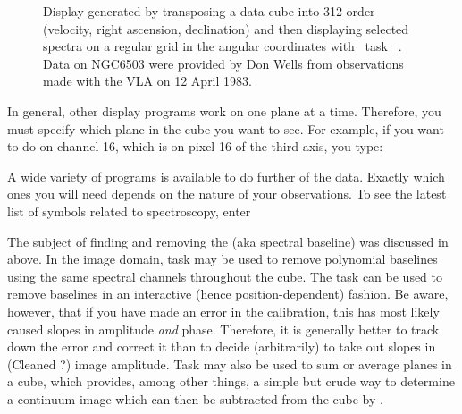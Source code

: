\begin{figure}
\centering
\caption[{\tt PLCUB} display of spectra from a cube]{ Display
generated by transposing a data cube into 312 order (velocity, right
ascension, declination) and then displaying selected spectra on a
regular grid in the angular coordinates with \AIPS\ task {\tt
{}}\@.  Data on NGC6503 were provided by Don Wells from
observations made with the VLA on 12 April 1983.}
\label{fig:linespect}
\end{figure}

    In general, other display programs work on one plane at a time.
Therefore, you must specify which plane in the cube you want to see.
For example, if you want to do {\tt {}} on channel 16, which
is on pixel 16 of the third axis, you type:

\vfill\eject
{}

     A wide variety of programs is available to do further
 of the data.   Exactly which ones you will need
depends on the nature of your observations.  To see the latest list of
symbols related to spectroscopy, enter

    The subject of finding and removing the  (aka
spectral baseline) was discussed in  above.  In the
image domain, task {\tt {}} may be used to remove polynomial
baselines using the same spectral channels throughout the cube.  The
task {\tt {}} can be used to remove baselines in an
interactive (hence position-dependent) fashion. Be aware, however,
that if you have made an error in the calibration, this has most
likely caused slopes in amplitude {\it and\/} phase.  Therefore, it is
generally better to track down the error and correct it than to decide
(arbitrarily) to take out slopes in (Cleaned ?) image amplitude.  Task
{\tt {}} may also be used to sum or average planes in a
cube, which provides, among other things, a simple but crude way to
determine a continuum image which can then be subtracted from the cube
by {\tt {}}\@.

